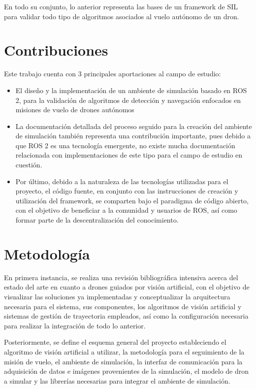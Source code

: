 En todo su conjunto, lo anterior representa las bases de un framework de SIL para validar todo tipo de algoritmos asociados al vuelo autónomo de un dron.

\section{Contribuciones}

Este trabajo cuenta con 3 principales aportaciones al campo de estudio:

\begin{itemize}
    \item El diseño y la implementación de un ambiente de simulación basado en ROS 2, para la validación de algoritmos de detección y navegación enfocados en misiones de vuelo de drones autónomos
    \item La documentación detallada del proceso seguido para la creación del ambiente de simulación también representa una contribución importante, pues debido a que ROS 2 es una tecnología emergente, no existe mucha documentación relacionada con implementaciones de este tipo para el campo de estudio en cuestión.
    \item Por último, debido a la naturaleza de las tecnologías utilizadas para el proyecto, el código fuente, en conjunto con las instrucciones de creación y utilización del framework, se comparten bajo el paradigma de código abierto, con el objetivo de beneficiar a la comunidad y usuarios de ROS, así como formar parte de la descentralización del conocimiento.
\end{itemize}


\section{Metodología}

En primera instancia, se realiza una revisión bibliográfica intensiva acerca del estado del arte en cuanto a drones guiados por visión artificial, con el objetivo de visualizar las soluciones ya implementadas y conceptualizar la arquitectura necesaria para el sistema, sus componentes, los algoritmos de visión artificial y sistemas de gestión de trayectoria empleados, así como la configuración necesaria para realizar la integración de todo lo anterior.

Posteriormente, se define el esquema general del proyecto estableciendo el algoritmo de visión artificial a utilizar, la metodología para el seguimiento de la misión de vuelo, el ambiente de simulación, la interfaz de comunicación para la adquisición de datos e imágenes provenientes de la simulación, el modelo de dron a simular y las librerías necesarias para integrar el ambiente de simulación.

